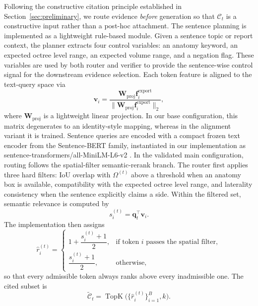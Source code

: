 Following the constructive citation principle established in Section~\ref{sec:preliminary}, we route evidence \emph{before} generation so that $\mathcal{C}_t$ is a constructive input rather than a post-hoc attachment. The sentence planning is implemented as a lightweight rule-based module. Given a sentence topic or report context, the planner extracts four control variables: an anatomy keyword, an expected octree level range, an expected volume range, and a negation flag. These variables are used by both router and verifier to provide the sentence-wise control signal for the downstream evidence selection. Each token feature is aligned to the text-query space via
\begin{equation}
\mathbf{v}_i=
\frac{\mathbf{W}_{\mathrm{proj}}\mathbf{f}_i^{\mathrm{export}}}
{\|\mathbf{W}_{\mathrm{proj}}\mathbf{f}_i^{\mathrm{export}}\|_2},
\label{eq:projection_new_v2}
\end{equation}
where $\mathbf{W}_{\mathrm{proj}}$ is a lightweight linear projection. In our base configuration, this matrix degenerates to an identity-style mapping, whereas in the alignment variant it is trained. Sentence queries are encoded with a compact frozen text encoder from the Sentence-BERT family, instantiated in our implementation as sentence-transformers/all-MiniLM-L6-v2 \cite{reimers2019sentencebert,wang2020minilm}. In the validated main configuration, routing follows the spatial-filter semantic-rerank branch. The router first applies three hard filters: IoU overlap with $\Omega^{(t)}$ above a threshold when an anatomy box is available, compatibility with the expected octree level range, and laterality consistency when the sentence explicitly claims a side. Within the filtered set, semantic relevance is computed by
\begin{equation}
s_i^{(t)}=\mathbf{q}_t^\top \mathbf{v}_i.
\label{eq:semantic_main}
\end{equation}
The implementation then assigns
\begin{equation}
\hat{r}_i^{(t)}=
\begin{cases}
1+\dfrac{s_i^{(t)}+1}{2}, & \text{if token } i \text{ passes the spatial filter},\\[6pt]
\dfrac{s_i^{(t)}+1}{2}, & \text{otherwise},
\end{cases}
\label{eq:routing_main_branch}
\end{equation}
so that every admissible token always ranks above every inadmissible one. The cited subset is
\begin{equation}
\widetilde{\mathcal{C}}_t = \operatorname{TopK}\!\big(\{\hat{r}_i^{(t)}\}_{i=1}^{B},k\big).
\label{eq:topk_new_v2}
\end{equation}
